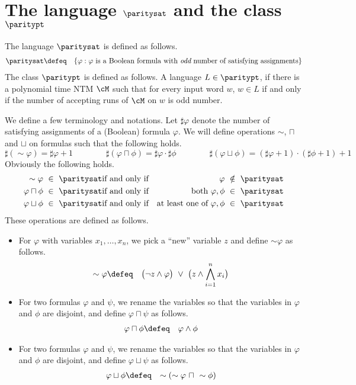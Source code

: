 \documentclass[11pt, a4paper]{article}
\begin{document}
\section{The language $\paritysat$ and the class $\paritypt$}
\label{sec:paritysat}

The language $\paritysat$ is defined as follows.
\begin{eqnarray*}
\paritysat & \defeq & \{\varphi : \varphi\ \text{is a Boolean formula with {\em odd} number of satisfying assignments}\}
\end{eqnarray*}
The class $\paritypt$ is defined as follows.
A language $L \in \paritypt$, if there is a polynomial time NTM $\cM$
such that for every input word $w$, $w\in L$ if and only if
the number of accepting runs of $\cM$ on $w$ is odd number.

We define a few terminology and notations.
Let $\sharp\varphi$ denote the number of 
satisfying assignments of a (Boolean) formula $\varphi$.
We will define operations $\sim$, $\sqcap$ and $\sqcup$ on formulas such that
the following holds.
$$
\sharp(\sim\varphi)=\sharp\varphi +1\qquad\qquad
\sharp(\varphi\sqcap\phi)=\sharp\varphi \cdot \sharp\phi \qquad\qquad
\sharp(\varphi\sqcup\phi)=(\sharp\varphi +1)\cdot(\sharp\phi +1)+1
$$
Obviously the following holds.
\begin{eqnarray*}
\sim\varphi\ \in \ \paritysat & \text{if and only if} & \varphi\ \notin\ \paritysat
\\
\varphi\sqcap\phi\ \in\ \paritysat & \text{if and only if} & \text{both}\ \varphi,\phi\ \in\ \paritysat
\\
\varphi\sqcup\phi\ \in\ \paritysat & \text{if and only if} & \text{at least one of}\ \varphi,\phi\ \in\ \paritysat
\end{eqnarray*}
These operations are defined as follows.
\begin{itemize}
\item
For $\varphi$ with variables $x_1,\ldots,x_n$,
we pick a ``new'' variable $z$ and define $\sim\varphi$ as follows.
\begin{eqnarray*}
\sim\varphi & \defeq &
\big(\neg z \wedge \varphi\big) \ \vee \ \big(z\wedge \bigwedge_{i=1}^n x_i\big)
\end{eqnarray*}
\item
For two formulas $\varphi$ and $\psi$, we rename the variables 
so that the variables in $\varphi$ and $\phi$ are disjoint,
and define $\varphi\sqcap\psi$ as follows.
\begin{eqnarray*}
\varphi\sqcap\phi & \defeq &
\varphi\wedge\phi
\end{eqnarray*}
\item
For two formulas $\varphi$ and $\psi$, we rename the variables 
so that the variables in $\varphi$ and $\phi$ are disjoint,
and define $\varphi\sqcup\psi$ as follows.
\begin{eqnarray*}
\varphi\sqcup\phi & \defeq &
\sim(\sim\varphi \ \sqcap \ \sim\phi)
\end{eqnarray*}
\end{itemize}
\end{document}
